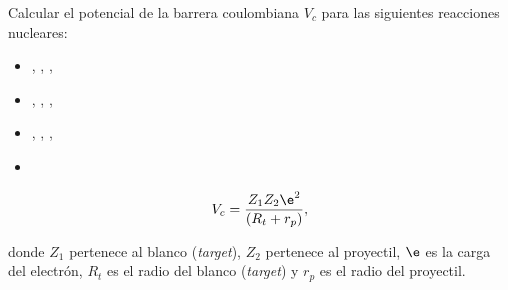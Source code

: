 \documentclass[./../main.tex]{subfiles}
\begin{document}
    \begin{exercise}
        Calcular el potencial de la barrera coulombiana \(V_{c}\) para las siguientes reacciones nucleares:

        \begin{itemize}
            \item {}, , , 
            \item {}, , , 
            \item {}, , , 
            \item {}
        \end{itemize}

        \begin{equation*}
            V_{c} = \dfrac{Z_{1}Z_{2}\e^{2}}{(R_{t} + r_{p})},
        \end{equation*}

        donde \(Z_{1}\) pertenece al blanco (\emph{target}), \(Z_{2}\) pertenece al proyectil, \(\e\) es la carga del electrón, \(R_{t}\) es el radio del blanco (\emph{target}) y \(r_{p}\) es el radio del proyectil.
    \end{exercise}
\end{document}
